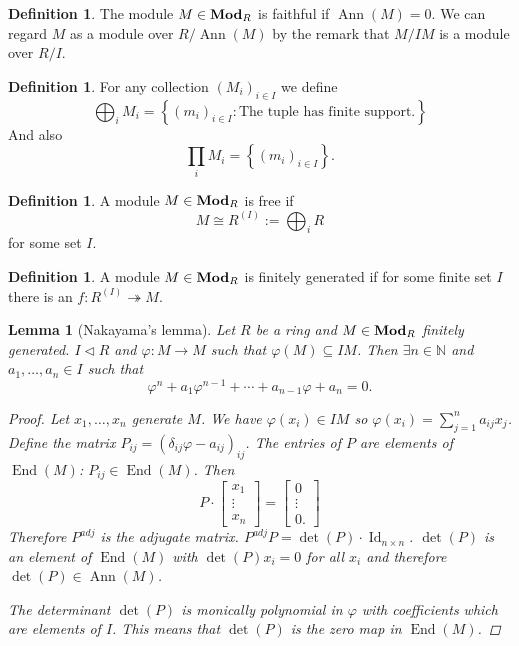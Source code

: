 \documentclass{article}
\newcommand{\N}{\mathbb{N}}
\DeclareMathOperator{\Id}{Id}
\DeclareMathOperator{\End}{End}
\DeclareMathOperator{\modules}{{\bf Mod}}
\newcommand{\set}[1]{\left\{#1\right\}}
\newcommand{\setwith}[2]{\left\{#1:#2\right\}}
\DeclareMathOperator{\Ann}{Ann}
\newcommand{\ideal}{\triangleleft}
\newtheorem{lemma}[theorem]{Lemma}
\theoremstyle{definition}
\newtheorem{definition}[theorem]{Definition}
\begin{document}
\begin{definition}
    The module \(M\in\modules_{R}\) is faithful if \(\Ann(M)=0\). We can regard
    \(M\) as a module over \(R/\Ann(M)\) by the remark that \(M/IM\) is a module
    over \(R/I\).
\end{definition}

\begin{definition}
    For any collection \((M_{i})_{i\in I}\) we define
    \[
        \bigoplus_{i}M_{i}=\setwith{(m_{i})_{i\in I}}{\text{The tuple has finite support.}}
    \]
    And also
    \[
        \prod_{i}M_{i}=\set{(m_{i})_{i\in I}}.
    \]
\end{definition}

\begin{definition}
    A module \(M\in\modules_{R}\) is free if
    \[
        M\cong R^{(I)}:=\bigoplus_{i}R
    \]
    for some set \(I\).
\end{definition}

\begin{definition}
    A module \(M\in\modules_{R}\) is finitely generated if for some finite set
    \(I\) there is an \(f:R^{(I)}\twoheadrightarrow M\).
\end{definition}

\begin{lemma}[Nakayama's lemma]
    Let \(R\) be a ring and \(M\in\modules_{R}\) finitely generated. \(I\ideal
    R\) and \(\varphi:M\to M\) such that \(\varphi(M)\subseteq IM\). Then
    \(\exists n\in\N\) and \(a_{1},\ldots,a_{n}\in I\) such that
    \[
        \varphi^{n}+a_{1}\varphi^{n-1}+\cdots+a_{n-1}\varphi+a_{n}=0.
    \]

    \begin{proof}
        Let \(x_{1},\ldots,x_{n}\) generate \(M\). We have \(\varphi(x_{i})\in
        IM\) so \(\varphi(x_{i})=\sum_{j=1}^{n}a_{ij}x_{j}\). Define the matrix
        \(P_{ij}=(\delta_{ij}\varphi-a_{ij})_{ij}\). The entries of \(P\) are
        elements of \(\End(M)\): \(P_{ij}\in \End(M)\). Then
        \[
            P\cdot\begin{bmatrix}
                x_{1}  \\
                \vdots \\
                x_{n}
            \end{bmatrix}=\begin{bmatrix}
                0      \\
                \vdots \\
                0.
            \end{bmatrix}
        \]
        Therefore \(P^{adj}\) is the adjugate matrix.
        \(P^{adj}P=\det(P)\cdot\Id_{n\times n}\). \(\det(P)\) is an element of
        \(\End(M)\) with \(\det(P)x_{i}=0\) for all \(x_{i}\) and therefore
        \(\det(P)\in\Ann(M)\).

        The determinant \(\det(P)\) is monically polynomial in \(\varphi\) with
        coefficients which are elements of \(I\). This means that \(\det(P)\) is
        the zero map in \(\End(M)\).
    \end{proof}
\end{lemma}
\end{document}
